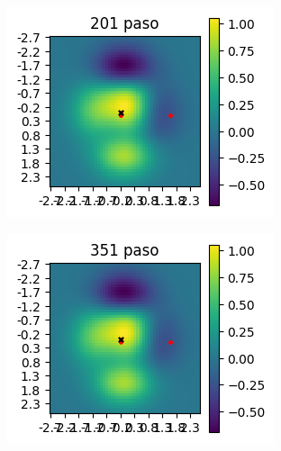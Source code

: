 \documentclass{article}
\begin{document}
\begin{figure}
\begin{subfigure}[b]{0.40\textwidth}
         \centering
         \includegraphics[width=\textwidth]{p7p_200.png}
         \caption{}
         \label{fig:tocan}
     \end{subfigure}
     \begin{subfigure}[b]{0.40\textwidth}
         \centering
         \includegraphics[width=\textwidth]{p7p_350.png}
         \caption{}
         \label{fig:tocan}
         \begin{subfigure}[b]{0.40\textwidth}
         \centering

\end{subfigure}
\end{subfigure}
\end{figure}
\end{document}
